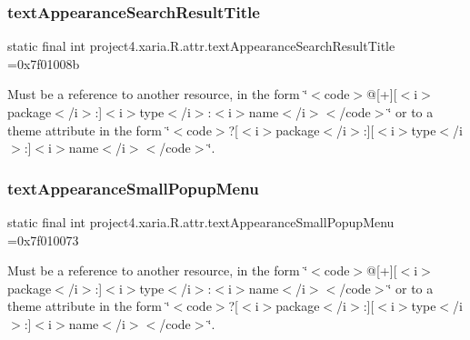 \subsubsection{\texorpdfstring{text\+Appearance\+Search\+Result\+Title}{textAppearanceSearchResultTitle}}
{\footnotesize\ttfamily static final int project4.\+xaria.\+R.\+attr.\+text\+Appearance\+Search\+Result\+Title =0x7f01008b\hspace{0.3cm}{\ttfamily [static]}}

Must be a reference to another resource, in the form \char`\"{}$<$code$>$@\mbox{[}+\mbox{]}\mbox{[}$<$i$>$package$<$/i$>$\+:\mbox{]}$<$i$>$type$<$/i$>$\+:$<$i$>$name$<$/i$>$$<$/code$>$\char`\"{} or to a theme attribute in the form \char`\"{}$<$code$>$?\mbox{[}$<$i$>$package$<$/i$>$\+:\mbox{]}\mbox{[}$<$i$>$type$<$/i$>$\+:\mbox{]}$<$i$>$name$<$/i$>$$<$/code$>$\char`\"{}. \mbox{\label{classproject4_1_1xaria_1_1R_1_1attr_aa3b8af07d8b68482a1b809016da6a646}} 
\subsubsection{\texorpdfstring{text\+Appearance\+Small\+Popup\+Menu}{textAppearanceSmallPopupMenu}}
{\footnotesize\ttfamily static final int project4.\+xaria.\+R.\+attr.\+text\+Appearance\+Small\+Popup\+Menu =0x7f010073\hspace{0.3cm}{\ttfamily [static]}}

Must be a reference to another resource, in the form \char`\"{}$<$code$>$@\mbox{[}+\mbox{]}\mbox{[}$<$i$>$package$<$/i$>$\+:\mbox{]}$<$i$>$type$<$/i$>$\+:$<$i$>$name$<$/i$>$$<$/code$>$\char`\"{} or to a theme attribute in the form \char`\"{}$<$code$>$?\mbox{[}$<$i$>$package$<$/i$>$\+:\mbox{]}\mbox{[}$<$i$>$type$<$/i$>$\+:\mbox{]}$<$i$>$name$<$/i$>$$<$/code$>$\char`\"{}. \mbox{\label{classproject4_1_1xaria_1_1R_1_1attr_ac5fb1c686fef06ad9f36944ff64f0f99}} 
